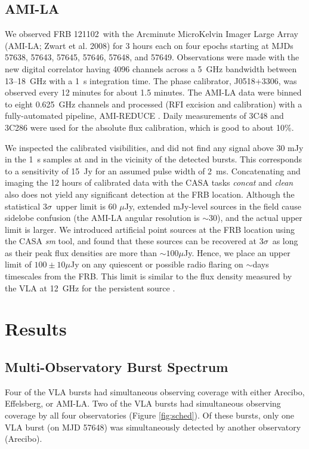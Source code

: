 \documentclass[twocolumn]{aastex61}
\newcommand{\frb}{FRB 121102}
\begin{document}
\subsection{AMI-LA}

We observed \frb\ with the Arcminute MicroKelvin Imager Large Array (AMI-LA; Zwart et al. 2008) for 3 hours each on four epochs starting at MJDs 57638, 57643, 57645, 57646, 57648, and 57649. Observations were made with the new digital correlator having 4096 channels across a 5~GHz bandwidth between 13--18~GHz with a 1~s integration time. The phase calibrator, J0518+3306, was observed every 12 minutes for about 1.5 minutes. The AMI-LA data were binned to eight 0.625~GHz channels and processed (RFI excision and calibration) with a fully-automated pipeline, AMI-REDUCE \citep[e.g.,][]{2013MNRAS.429.3330P}. Daily measurements of 3C48 and 3C286 were used for the absolute flux calibration, which is good to about 10\%. 

We inspected the calibrated visibilities, and did not find any signal above 30 mJy in the 1~s samples at and in the vicinity of the detected bursts. This corresponds to a sensitivity of 15~Jy for an assumed pulse width of 2~ms. Concatenating and imaging the 12 hours of calibrated data with the CASA tasks {\it concat} and {\it clean} also does not yield any significant detection at the FRB location. Although the statistical $3\sigma$\ upper limit is 60 $\mu$Jy, extended mJy-level sources in the field cause sidelobe confusion (the AMI-LA angular resolution is $\sim$30\arcsec), and the actual upper limit is larger. We introduced artificial point sources at the FRB location using the CASA {\it sm} tool, and found that these sources can be recovered at $3\sigma$\ as long as their peak flux densities are more than $\sim100\mu$Jy. Hence, we place an upper limit of $100\pm10 \mu$Jy on any quiescent or possible radio flaring on $\sim$days timescales from the FRB. This limit is similar to the flux density measured by the VLA at 12~GHz for the persistent source \citep{LOC}.

\section{Results}
\label{sec:res}

\subsection{Multi-Observatory Burst Spectrum}

Four of the VLA bursts had simultaneous observing coverage with either Arecibo, Effelsberg, or AMI-LA. Two of the VLA bursts had simultaneous observing coverage by all four observatories (Figure \ref{fig:sched}). Of these bursts, only one VLA burst (on MJD 57648) was simultaneously detected by another observatory (Arecibo). 
\end{document}
